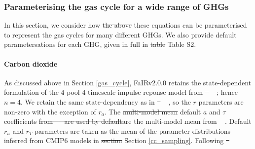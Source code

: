 \documentclass[gmd, manuscript]{copernicus}
\providecommand{\DIFadd}[1]{{\protect\color{blue}#1}} %
\providecommand{\DIFdel}[1]{{\protect\color{red}\sout{#1}}}                      %
\providecommand{\DIFaddbegin}{} %
\providecommand{\DIFaddend}{} %
\providecommand{\DIFdelbegin}{} %
\providecommand{\DIFdelend}{} %
\begin{document}
\subsubsection{Parameterising the gas cycle for a wide range of GHGs} \label{gas_cycle_parameters}
In this section, we consider how \DIFdelbegin \DIFdel{the above }\DIFdelend \DIFaddbegin \DIFadd{these }\DIFaddend equations can be parameterised to represent the gas cycles for many different GHGs. We also provide default parametersations for each GHG, given in full in \DIFdelbegin \DIFdel{table }\DIFdelend \DIFaddbegin \DIFadd{Table }\DIFaddend S2.
\paragraph*{Carbon dioxide}
As discussed above \DIFaddbegin \DIFadd{in Section \ref{gas_cycle}}\DIFaddend , FaIRv2.0\DIFaddbegin \DIFadd{.0 }\DIFaddend retains the state-dependent formulation \citep{Millar2016} of the \DIFdelbegin \DIFdel{4-pool }\DIFdelend \DIFaddbegin \DIFadd{4-timescale }\DIFaddend impulse-reponse model from \DIFdelbegin \DIFdel{\mbox{%
\cite{Joos2013}}\hspace{0pt}%
}\DIFdelend \DIFaddbegin \DIFadd{\mbox{%
\citet{Joos2013}}\hspace{0pt}%
}\DIFaddend ; hence $n=4$. We retain the same state-dependency as in \DIFdelbegin \DIFdel{\mbox{%
\cite{Millar2016}}\hspace{0pt}%
}\DIFdelend \DIFaddbegin \DIFadd{\mbox{%
\citet{Millar2016}}\hspace{0pt}%
}\DIFaddend , so the $r$ parameters are non-zero with the exception of $r_a$. The \DIFdelbegin \DIFdel{multi-model mean }\DIFdelend \DIFaddbegin \DIFadd{default }\DIFaddend $a$ and $\tau$ coefficients \DIFdelbegin \DIFdel{from \mbox{%
\cite{Joos2013} }\hspace{0pt}%
are used by default}\DIFdelend \DIFaddbegin \DIFadd{are the multi-model mean from \mbox{%
\citet{Joos2013}}\hspace{0pt}%
}\DIFaddend . Default $r_u$ and $r_T$ parameters are taken as the mean of the parameter distributions inferred from CMIP6 models in \DIFdelbegin \DIFdel{section }\DIFdelend \DIFaddbegin \DIFadd{Section }\DIFaddend \ref{cc_sampling}. Following \DIFdelbegin \DIFdel{\mbox{%
\cite{Jenkins2018}}\hspace{0pt}%
}\DIFdelend \DIFaddbegin \DIFadd{\mbox{%
\citet{Jenkins2018}}\hspace{0pt}%
}
\end{document}

